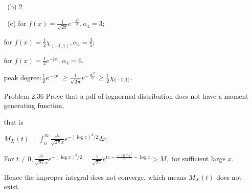 \documentclass{article}
\begin{document}
\qquad \qquad\ (b) 2

\qquad \qquad\ (c) for $f(x)=\frac{1}{\sqrt{2\pi }}e^{-\frac{x^{2}}{2}%
},\alpha _{4}=3;$

\qquad \qquad \qquad \qquad for $f(x)=\frac{1}{2}\chi _{(-1,1)},\alpha _{4}=%
\frac{3}{5};$

\qquad \qquad \qquad \qquad for $f(x)=\frac{1}{2}e^{-\left\vert x\right\vert
},\alpha _{4}=6.$

peak degree:$\frac{1}{2}e^{-\left\vert x\right\vert }\geq \frac{1}{\sqrt{%
2\pi }}e^{-\frac{x^{2}}{2}}\geq \frac{1}{2}\chi _{(-1,1)}.$

Problem 2.36 Prove that a pdf of lognormal distribution does not have a
moment generating function,

that is 

$M_{X}\left( t\right) =\int_{0}^{\infty }\frac{e^{tx}}{\sqrt{2\pi }x}%
e^{-\left( \log x\right) ^{2}/2}dx.$

For $t\neq 0,\frac{e^{tx}}{\sqrt{2\pi }x}e^{-\left( \log x\right) ^{2}/2}=%
\frac{1}{\sqrt{2\pi }}e^{tx-\frac{\left( \log x\right) ^{2}}{2}-\log x}>M,$
for sufficient large $x.$

Hence the improper integral does not converge, which means $M_{X}\left(
t\right) $ does not exist.
\end{document}
